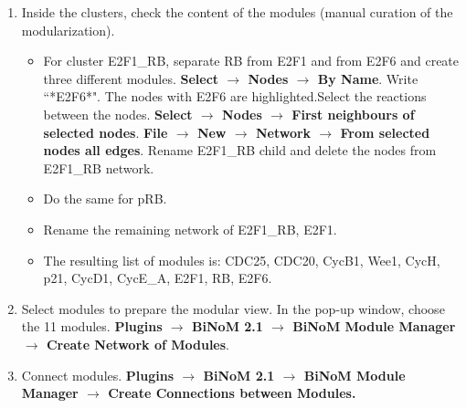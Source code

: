 \documentclass[a4paper,10pt]{article}
\begin{document}
\begin{enumerate}
\item	Inside the clusters, check the content of the modules (manual curation
of the modularization).

\begin{itemize}
\item	For cluster E2F1\_RB, separate RB from E2F1 and from E2F6 and create
three different modules. \textbf{Select $\rightarrow$ Nodes $\rightarrow$ By Name}. Write ``*E2F6*". The
nodes with E2F6 are highlighted.Select the reactions between the nodes.
\textbf{Select $\rightarrow$ Nodes $\rightarrow$ First neighbours of selected nodes}. \textbf{File $\rightarrow$ New
 $\rightarrow$ Network $\rightarrow$ From selected nodes all edges}. Rename E2F1\_RB child and delete the
nodes from E2F1\_RB network.
\item	Do the same for pRB.
\item	Rename the remaining network of E2F1\_RB, E2F1.
\item	The resulting list of modules is: CDC25, CDC20, CycB1, Wee1, CycH, p21, CycD1,
CycE\_A, E2F1, RB, E2F6.
\end{itemize}

\item	Select modules to prepare the modular view. In the pop-up window, choose
the 11 modules. \textbf{Plugins $\rightarrow$  BiNoM 2.1 $\rightarrow$ BiNoM Module Manager$\rightarrow$ Create Network of Modules}.
\item	Connect modules. \textbf{Plugins $\rightarrow$  BiNoM 2.1 $\rightarrow$ BiNoM Module Manager $\rightarrow$ Create Connections between Modules.}


\end{enumerate}
 

\end{document}
